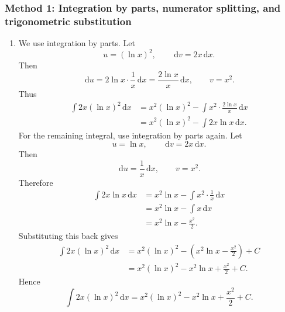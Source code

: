 \documentclass[12pt]{article}
\newcommand{\dd}{\,\mathrm{d}}
\begin{document}
\subsubsection{Method 1: Integration by parts, numerator splitting, and trigonometric substitution}

\begin{enumerate}[label=(\alph*)]
\item We use integration by parts. Let
\[
u=(\ln x)^2,\qquad \dd v=2x\dd x.
\]
Then
\[
\dd u=2\ln x\cdot \frac1x\dd x=\frac{2\ln x}{x}\dd x,
\qquad
v=x^2.
\]
Thus
\begin{align*}
\int 2x(\ln x)^2\dd x
&=x^2(\ln x)^2-\int x^2\cdot \frac{2\ln x}{x}\dd x\\
&=x^2(\ln x)^2-\int 2x\ln x\dd x.
\end{align*}
For the remaining integral, use integration by parts again. Let
\[
u=\ln x,\qquad \dd v=2x\dd x.
\]
Then
\[
\dd u=\frac1x\dd x,\qquad v=x^2.
\]
Therefore
\begin{align*}
\int 2x\ln x\dd x
&=x^2\ln x-\int x^2\cdot\frac1x\dd x\\
&=x^2\ln x-\int x\dd x\\
&=x^2\ln x-\frac{x^2}{2}.
\end{align*}
Substituting this back gives
\begin{align*}
\int 2x(\ln x)^2\dd x
&=x^2(\ln x)^2-\left(x^2\ln x-\frac{x^2}{2}\right)+C\\
&=x^2(\ln x)^2-x^2\ln x+\frac{x^2}{2}+C.
\end{align*}
Hence
\[
\boxed{\int 2x(\ln x)^2\dd x
=x^2(\ln x)^2-x^2\ln x+\frac{x^2}{2}+C.}
\]


\end{enumerate}
\end{document}
